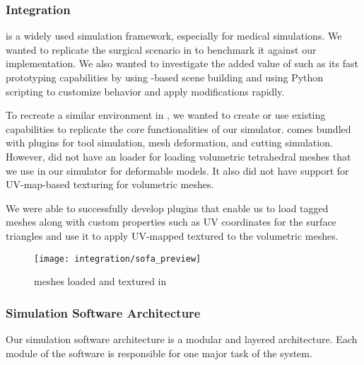 \subsubsection{ Integration}
 is a widely used simulation framework, especially for medical simulations. We wanted to replicate the surgical scenario in  to benchmark it against our implementation. We also wanted to investigate the added value of  such as its fast prototyping capabilities by using -based scene building and using Python scripting to customize behavior and apply modifications rapidly.

To recreate a similar environment in , we wanted to create or use existing  capabilities to replicate the core functionalities of our simulator.  comes bundled with plugins for tool simulation, mesh deformation, and cutting simulation. However,  did not have an  loader for loading volumetric tetrahedral meshes that we use in our simulator for deformable models. It also did not have support for UV-map-based texturing for volumetric meshes.

We were able to successfully develop plugins that enable us to load tagged  meshes along with custom properties such as UV coordinates for the surface triangles and use it to apply UV-mapped textured to the volumetric meshes.

\begin{figure}
  \centering
  \texttt{[image: integration/sofa\_preview]}
  \caption{ meshes loaded and textured in }\label{fig:sofa_preview}
\end{figure}

\subsubsection{Simulation Software Architecture}\label{sec:software_architecture}
Our simulation software architecture is a modular and layered architecture. Each module of the software is responsible for one major task of the system.

